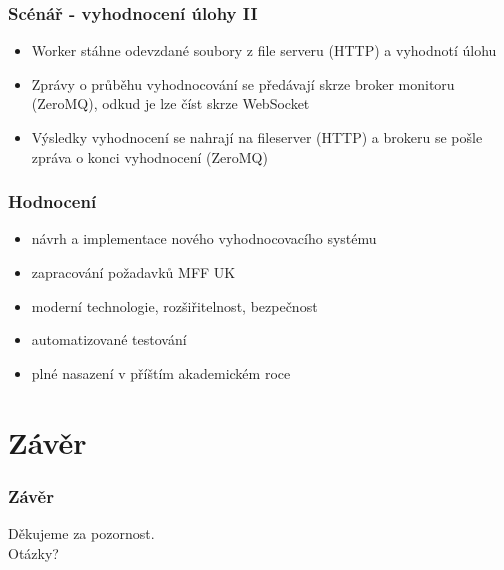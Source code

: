 \documentclass{beamer}
\begin{document}
\begin{frame}
	\frametitle{Scénář - vyhodnocení úlohy II}
	\begin{itemize}
		\item Worker stáhne odevzdané soubory z file serveru (HTTP) a vyhodnotí úlohu
		\item Zprávy o průběhu vyhodnocování se předávají skrze broker monitoru (ZeroMQ), odkud je lze číst skrze WebSocket
		\item Výsledky vyhodnocení se nahrají na fileserver (HTTP) a brokeru se pošle zpráva o konci vyhodnocení (ZeroMQ)
	\end{itemize}
\end{frame}

\begin{frame}
	\frametitle{Hodnocení}
	\begin{itemize}
		\item návrh a implementace nového vyhodnocovacího systému
		\item zapracování požadavků MFF UK
		\item moderní technologie, rozšiřitelnost, bezpečnost
		\item automatizované testování
		\item plné nasazení v příštím akademickém roce
	\end{itemize}
\end{frame}

\section{Závěr}
\begin{frame}
	\frametitle{Závěr}
	\centering
	Děkujeme za pozornost.\\
	\LARGE{Otázky?}
\end{frame}
\end{document}
